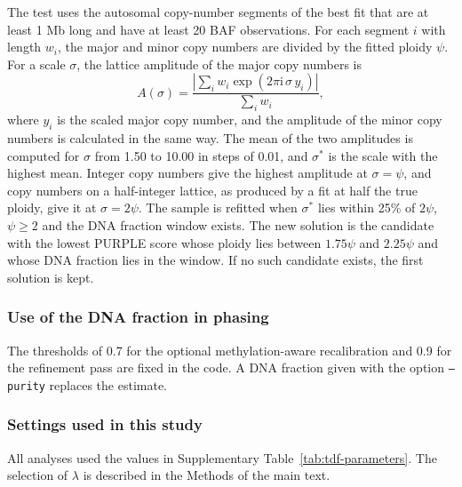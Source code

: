 \documentclass[pdflatex,sn-nature]{sn-jnl}
\begin{document}
The test uses the autosomal copy-number segments of the best fit that are at least 1 Mb long and have at least 20 BAF observations. For each segment $i$ with length $w_i$, the major and minor copy numbers are divided by the fitted ploidy $\psi$. For a scale $\sigma$, the lattice amplitude of the major copy numbers is
\[
A(\sigma) = \frac{\left|\sum_i w_i \exp\left(2\pi \mathrm{i}\, \sigma\, y_i\right)\right|}{\sum_i w_i},
\]
where $y_i$ is the scaled major copy number, and the amplitude of the minor copy numbers is calculated in the same way. The mean of the two amplitudes is computed for $\sigma$ from 1.50 to 10.00 in steps of 0.01, and $\sigma^*$ is the scale with the highest mean. Integer copy numbers give the highest amplitude at $\sigma = \psi$, and copy numbers on a half-integer lattice, as produced by a fit at half the true ploidy, give it at $\sigma = 2\psi$. The sample is refitted when $\sigma^*$ lies within 25\% of $2\psi$, $\psi \ge 2$ and the DNA fraction window exists. The new solution is the candidate with the lowest PURPLE score whose ploidy lies between $1.75\psi$ and $2.25\psi$ and whose DNA fraction lies in the window. If no such candidate exists, the first solution is kept.

\subsubsection{Use of the DNA fraction in phasing}

The thresholds of 0.7 for the optional methylation-aware recalibration and 0.9 for the refinement pass are fixed in the code. A DNA fraction given with the option \texttt{--purity} replaces the estimate.

\subsubsection{Settings used in this study}

All analyses used the values in Supplementary Table~\ref{tab:tdf-parameters}. The selection of $\lambda$ is described in the Methods of the main text.
\end{document}
